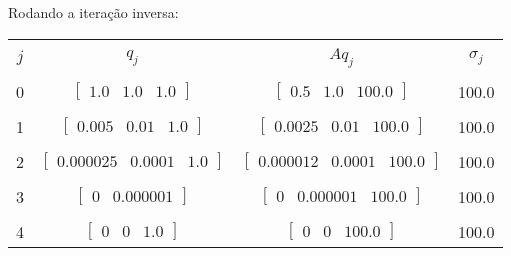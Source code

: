 \documentclass[a4paper,11pt]{article}
\begin{document}
\begin{enumerate}[label=\textbf{(\alph*)}]
            Rodando a iteração inversa:
            \begin{center}
                \begin{tabular}{ | c | c | c | c | } 
                    \hline
                    & & & \\ [-1em]
                    $j$ & $q_j$ & $Aq_j$ & $\sigma_j$\\  [+.5em]
                    \hline\hline
                    & & & \\ [-1em]
                    0  & $\begin{bmatrix} 1.0 & 1.0 & 1.0 \end{bmatrix}$ & $\begin{bmatrix} 0.5 & 1.0 & 100.0 \end{bmatrix}$  & 100.0 \\ [+.5em]
                    \hline
                    & & & \\ [-1em]
                    1  & $\begin{bmatrix} 0.005 & 0.01 & 1.0 \end{bmatrix}$ & $\begin{bmatrix} 0.0025 & 0.01 & 100.0 \end{bmatrix}$  & 100.0 \\ [+.5em]
                    \hline
                    & & & \\ [-1em]
                    2  & $\begin{bmatrix} 0.000025 & 0.0001 & 1.0 \end{bmatrix}$ & $\begin{bmatrix} 0.000012 & 0.0001 & 100.0 \end{bmatrix}$  & 100.0 \\ [+.5em]
                    \hline
                    & & & \\ [-1em]
                    3  & $\begin{bmatrix} 0 & 0.000001 \end{bmatrix}$ & $\begin{bmatrix} 0 & 0.000001 & 100.0 \end{bmatrix}$  & 100.0 \\ [+.5em]
                    \hline
                    & & & \\ [-1em]
                    4  & $\begin{bmatrix} 0 & 0 & 1.0 \end{bmatrix}$ & $\begin{bmatrix} 0 & 0 & 100.0 \end{bmatrix}$  & 100.0 \\ [+.5em]

\end{tabular}
\end{center}
\end{enumerate}
\end{document}
